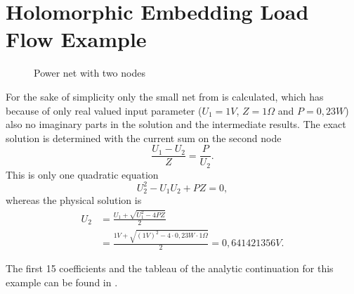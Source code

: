 \chapter{Holomorphic Embedding Load Flow Example}
\label{chap:helm_example}

\begin{figure}
	\centering
	
	\caption{Power net with two nodes}
	\label{fig:two_node_net}
\end{figure}

For the sake of simplicity only the small net from  is calculated, which has because of only real valued input parameter ($U_1 = \si{1}{V}$, $Z = \si{1}{\Omega}$ and $P = \si{0,23}{W}$) also no imaginary parts in the solution and the intermediate results. The exact solution is determined with the current sum on the second node
\begin{equation}
	\frac{U_1 - U_2}{Z} = \frac{P}{U_2}.
\end{equation}
This is only one quadratic equation
\begin{equation}
	U_2^2 - U_1 U_2 + P Z = 0,
\end{equation}
whereas the physical solution is
\begin{align}
	U_2 & = \frac{U_1 + \sqrt{U_1^2 - 4 P Z}}{2} \\
		& = \frac{\si{1}{V} + \sqrt{(\si{1}{V})^2 - 4 \cdot \si{0,23}{W} \cdot \si{1}{\Omega}}}{2} = \si{0,641421356}{V}.
\end{align}

The first 15 coefficients and the tableau of the analytic continuation for this example can be found in .

